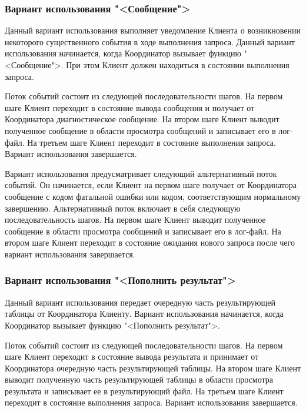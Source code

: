 \documentclass[11pt,oneside]{article}
\begin{document}
	\subsubsection{Вариант использования "<Сообщение">}
	Данный вариант использования выполняет уведомление Клиента о возникновении некоторого существенного события в ходе выполнения запроса. Данный вариант использования начинается, когда Координатор вызывает функцию "<Сообщение">. При этом Клиент должен находиться в состоянии выполнения запроса.
	\par Поток событий состоит из следующей последовательности шагов. На первом шаге Клиент переходит в состояние вывода сообщения и получает от Координатора диагностическое сообщение. На втором шаге Клиент выводит полученное сообщение в области просмотра сообщений и записывает его в лог-файл. На третьем шаге Клиент переходит в состояние выполнения запроса. Вариант использования завершается.
	\par Вариант использования предусматривает следующий альтернативный поток событий. Он начинается, если Клиент на первом шаге получает от Координатора сообщение с кодом фатальной ошибки или кодом, соответствующим нормальному завершению. Альтернативный поток включает в себя следующую последовательность шагов. На первом шаге Клиент выводит полученное сообщение в области просмотра сообщений и записывает его в лог-файл. На втором шаге Клиент переходит в состояние ожидания нового запроса после чего вариант использования завершается.
	
	\subsubsection{Вариант использования "<Пополнить результат">}
	Данный вариант использования передает очередную часть результирующей таблицы от Координатора Клиенту. Вариант использования начинается, когда Координатор вызывает функцию "<Пополнить результат">.
	\par Поток событий состоит из следующей последовательности шагов. На первом шаге Клиент переходит в состояние вывода результата и принимает от Координатора очередную часть результирующей таблицы. На втором шаге Клиент выводит полученную часть результирующей таблицы в области просмотра результата и записывает ее в результирующий файл. На третьем шаге Клиент переходит в состояние выполнения запроса. Вариант использования завершается.
	
\end{document}
